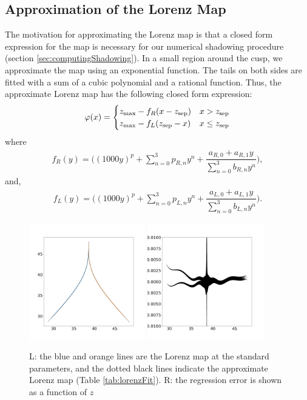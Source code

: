 \subsection{Approximation of the Lorenz Map}
\label{sec:lorenzMapApprox}
The motivation for approximating the Lorenz map is that a 
closed form expression for the map is necessary for our numerical shadowing procedure (section \ref{sec:computingShadowing}). In a small region around the cusp, we approximate the map using an exponential function. The tails on both sides are fitted with a sum of a cubic polynomial and a rational function. Thus, the approximate Lorenz map has the 
following closed form expression:
\begin{align}
    \varphi(x) = \begin{cases}
        z_{\rm max} - f_R(x - z_{\rm sep})   &  x > z_{\rm sep} \\
        z_{\rm max} -  f_L(z_{\rm sep} - x)   &  x \leq z_{\rm sep}
    \end{cases}
\end{align}
where 
\begin{align}
    f_R(y) = \Big( (1000 y)^p + 
        \sum_{n=0}^3 p_{R,n} y^n + \dfrac{a_{R,0} + a_{R,1} y}{\sum_{n=0}^3 b_{R,n} y^n}\Big),
\end{align}
and,
\begin{align}
    f_L(y) = \Big((1000 y)^p 
        + \sum_{n=0}^3 p_{L,n} y^n + \dfrac{a_{L,0} + a_{L,1}y}{\sum_{n=0}^3 b_{L,n} y^n}\Big).
\end{align}
\begin{figure}
		\includegraphics[width=0.45\textwidth]{lorenz_map_fit_lorenz_zmax_10_28_2.6666666666666665.npy.png}
		\includegraphics[width=0.45\textwidth]{lorenz_map_fit_error_lorenz_zmax_10_28_2.6666666666666665.npy.png}
		\caption{L: the blue and orange lines are the Lorenz map at the standard parameters, and the dotted black lines indicate the approximate Lorenz map (Table \ref{tab:lorenzFit}). R: the regression error is shown as a function of $z$} 
	\label{fig:lorenzMapComp}
\end{figure}
